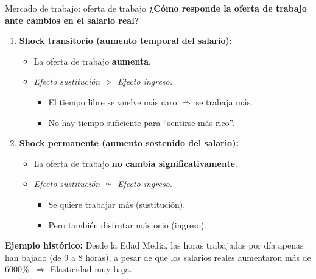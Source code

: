 \documentclass{beamer}
\begin{document}
\begin{frame}{Mercado de trabajo: oferta de trabajo}
\small
\textbf{¿Cómo responde la oferta de trabajo ante cambios en el salario real?}
\begin{enumerate}
\item \textbf{Shock transitorio (aumento temporal del salario):}
\begin{itemize}
    \item La oferta de trabajo \textbf{aumenta}.
    \item \textit{Efecto sustitución $>$ Efecto ingreso.}
    \begin{itemize}
        \item El tiempo libre se vuelve más caro $\Rightarrow$ se trabaja más.
        \item No hay tiempo suficiente para “sentirse más rico”.
    \end{itemize}
\end{itemize}

\item \textbf{Shock permanente (aumento sostenido del salario):}
\begin{itemize}
    \item La oferta de trabajo \textbf{no cambia significativamente}.
    \item \textit{Efecto sustitución $\simeq$ Efecto ingreso.}
    \begin{itemize}
        \item Se quiere trabajar más (sustitución).
        \item Pero también disfrutar más ocio (ingreso).
    \end{itemize}
\end{itemize}
\end{enumerate}
\textbf{Ejemplo histórico:}  
Desde la Edad Media, las horas trabajadas por día apenas han bajado (de 9 a 8 horas), a pesar de que los salarios reales aumentaron más de 6000\%. $\Rightarrow$ Elasticidad muy baja.
\end{frame}
\end{document}
